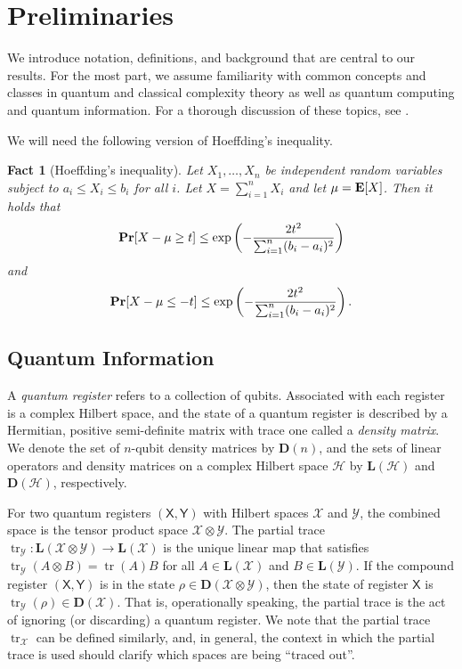 \documentclass[10pt,a4paper]{article}
\newtheorem{fact}[theorem]{Fact}
\theoremstyle{definition}
\renewcommand{\Pr}{\mathop{\bf Pr\/}}
\newcommand{\E}{\mathop{\bf E\/}}
\DeclareMathOperator{\tr}{tr}
\newcommand{\calH}{\mathcal{H}}
\newcommand{\calX}{\mathcal{X}}
\newcommand{\calY}{\mathcal{Y}}
\newcommand{\qreg}[1]{\mathsf{#1}}
\begin{document}
\section{Preliminaries}\label{sec:prelims}

We introduce notation, definitions, and background that are central to our results. 
For the most part, we assume familiarity with common concepts and classes in quantum and classical complexity theory as well as quantum computing and quantum information.
For a thorough discussion of these topics, see \cite{arora2009computational, watrous2018theory, kitaev2002classical, nielsen2002quantum}. 

We will need the following version of Hoeffding's inequality. 

\begin{fact}[Hoeffding’s inequality]\label{fact:hoeffding}
Let $X_1,\dots, X_n$ be independent random variables subject to $a_i \le X_i \le b_i$ for all $i$. 
Let $X = \sum_{i=1}^n X_i$ and let $\mu = \E[X]$. 
Then it holds that
\[
\Pr[X - \mu \geq t] \le \exp\left(- \frac{2t^2}{\sum_{i=1}^n (b_i - a_i)^2} \right)
\]
and 
\[
\Pr[X - \mu \leq -t] \le \exp\left(- \frac{2t^2}{\sum_{i=1}^n (b_i - a_i)^2} \right).
\]
\end{fact}

\subsection{Quantum Information}
A \textit{quantum register} refers to a collection of qubits. Associated with each register is a complex Hilbert space, and the state of a quantum register is described by a Hermitian, positive semi-definite matrix with trace one called a \textit{density matrix}.  
We denote the set of $n$-qubit density matrices by $\mathbf{D}(n)$, and the sets of linear operators and density matrices on a complex Hilbert space $\calH$ by $\mathbf{L}(\calH)$ and $\mathbf{D}(\calH)$, respectively. 

For two quantum registers $(\qreg{X}, \qreg{Y})$ with Hilbert spaces $\calX$ and $\calY$, the combined space is the tensor product space $\calX \otimes \calY$.   
The partial trace $\tr_{\calY}: \mathbf{L}(\calX \otimes \calY) \to \mathbf{L}(\calX)$ is the unique linear map that satisfies $\tr_\calY(A \otimes B) = \tr(A) B$ for all $A \in \mathbf{L}(\calX)$ and $B \in \mathbf{L}(\calY)$. 
If the compound register $(\qreg{X}, \qreg{Y})$ is in the state $\rho \in \mathbf{D}(\calX \otimes \calY)$, then the state of register $\qreg{X}$ is $\tr_\calY(\rho) \in \mathbf{D}(\calX)$.
That is, operationally speaking, the partial trace is the act of ignoring (or discarding) a quantum register.
We note that the partial trace $\tr_\calX$ can be defined similarly, and, in general, the context in which the partial trace is used should clarify which spaces are being ``traced out''.  
\end{document}
